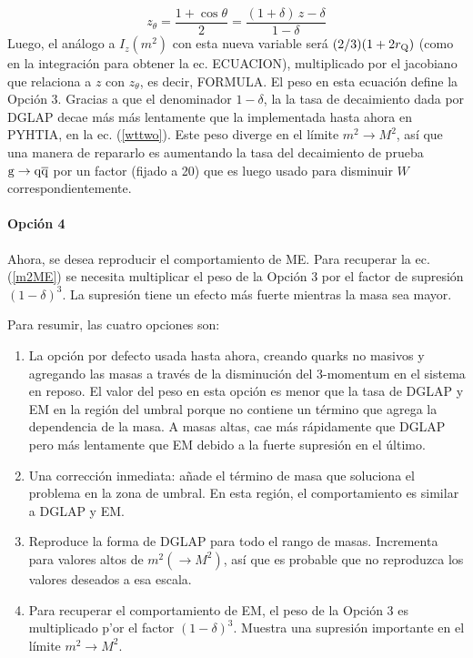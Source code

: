 \documentclass[a4paper,12pt]{article}
\begin{document}
\begin{equation}
z_{\theta} = \frac{1 + \cos\theta}{2} = 
\frac{ (1 + \delta) \, z - \delta}{1 - \delta}
\end{equation}Luego, el análogo a $I_z(m^2)$ con esta nueva variable será $(2/3)(1+2r_{\mathrm Q})$ (como en la integración para obtener la ec. ECUACION), multiplicado por el jacobiano que relaciona a $z$ con $z_\theta$, es decir,
FORMULA.
El peso en esta ecuación define la Opción 3. Gracias a que el denominador $1-\delta$, la la tasa de decaimiento dada por DGLAP decae más más lentamente que la implementada hasta ahora en \textsc{PYHTIA}, en la ec. (\ref{wttwo}). Este peso diverge en el límite $m^2\to M^2$, así que una manera de repararlo es aumentando la tasa del decaimiento de prueba ${\mathrm g}\to{\mathrm q}\overline{\mathrm q}$ por un factor (fijado a 20) que es luego usado para disminuir $W$ correspondientemente.

\paragraph{Opción 4}

Ahora, se desea reproducir el comportamiento de ME. Para recuperar la ec. (\ref{m2ME}) se necesita multiplicar el peso de la Opción 3 por el factor de supresión $(1-\delta)^3$. La supresión tiene un efecto más fuerte mientras la masa sea mayor.

Para resumir, las cuatro opciones son:

\begin{enumerate}
\item La opción por defecto usada hasta ahora, creando quarks no masivos y agregando las masas a través de la disminución del 3-momentum en el sistema en reposo. El valor del peso en esta opción es menor que la tasa de DGLAP y EM en la región del umbral porque no contiene un término que agrega la dependencia de la masa. A masas altas, cae más rápidamente que DGLAP pero más lentamente que EM debido a la fuerte supresión en el último.
\item Una corrección inmediata: añade el término de masa que soluciona el problema en la zona de umbral. En esta región, el comportamiento es similar a DGLAP y EM.
\item Reproduce la forma de DGLAP para todo el rango de masas. Incrementa para valores altos de $m^2(\to M^2)$, así que es probable que no reproduzca los valores deseados a esa escala.
\item Para recuperar el comportamiento de EM, el peso de la Opción 3 es multiplicado p'or el factor $(1-\delta)^3$. Muestra una supresión importante en el límite $m^2\to M^2$.
\end{enumerate}
\end{document}
